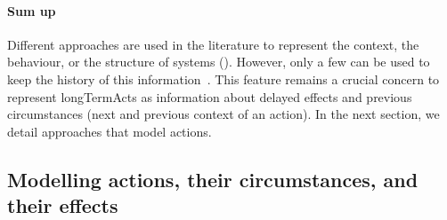 \paragraph{Sum up}
Different approaches are used in the literature to represent the \gls{context}, the \gls{behaviour}, or the \gls{structure} of systems (\cf {}).
However, only a few can be used to keep the history of this information~\cite{DBLP:conf/seke/0001FNMKT14, DBLP:conf/models/0001FNMKBT14, 	DBLP:conf/dbpl/MoffittS17, DBLP:conf/icse/TaharaOH17, DBLP:conf/pervasive/HenricksenIR02, DBLP:conf/smartgridsec/0001FKNT14}.
This feature remains a crucial concern to represent \glspl{longTermAct} as information about delayed effects and previous \glspl{circumstance} (next and previous \gls{context} of an \gls{action}).
In the next section, we detail approaches that model actions.
	
\subsection[Modelling actions, their circumstances, and their effects]{Modelling \glspl{action}, their \glspl{circumstance}, and their effects}


